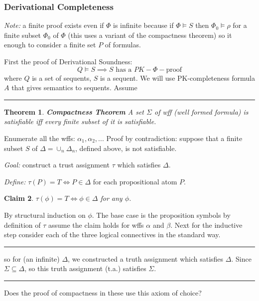 \documentclass[twoside]{article}
\newcounter{lecnum}
\newtheorem{theorem}{Theorem}[lecnum]
\newtheorem{claim}[theorem]{Claim}
\newenvironment{proof}{{\bf Proof:}}{\hfill\rule{2mm}{2mm}}
\begin{document}
\subsubsection{Derivational Completeness}
\textit{Note:} a finite proof exists even if $\Phi$ is infinite because if $\Phi \vDash S$ then $\Phi_0 \vDash \rho$ for a finite subset $\Phi_0$ of $\Phi$ (this uses a variant of the compactness theorem) so it enough to consider a finite set $P$ of formulas.

\begin{proof}
First the proof of Derivational Soundness:
\[Q \vDash S \implies S \mbox{ has a } PK-\Phi-\mbox{proof}\]
where $Q$ is a set of sequents, $S$ is a sequent. We will use PK-completeness formula $A$ that gives semantics to sequents. Assume
\end{proof} 

\begin{theorem}
\textbf{Compactness Theorem} A set $\Sigma$ of wff (well formed formula) is satisfiable iff every finite subset of it is satisfiable. 
\end{theorem}
\begin{proof}	
Enumerate all the wffs: $\alpha_1, \alpha_2, ...$ 
Proof by contradiction: suppose that a finite subset $S$ of $\Delta = \cup_{n} \Delta_n$, defined above, is not satisfiable.  

\textit{Goal:} construct a trust assignment $\tau$ which satisfies $\Delta$.

\textit{Define:} $\tau(P) = T \iff P \in \Delta$ for each propositional atom $P$.

\begin{claim}
$\tau(\phi) = T \iff \phi \in \Delta$ for any $\phi$.
\end{claim}
\begin{proof}
By structural induction on $\phi$. The base case is the proposition symbols by definition of $\tau$  assume the claim holds for wffs $\alpha$ and $\beta$. Next for the inductive step consider each of the three logical connectives in the standard way.  
\end{proof}

so for (an infinite) $\Delta$, we constructed a truth assignment which satisfies $\Delta$. Since $\Sigma \subseteq \Delta$, so this truth assignment (t.a.) satisfies $\Sigma$. 

\end{proof}

Does the proof of compactness in these use this axiom of choice?
\end{document}
